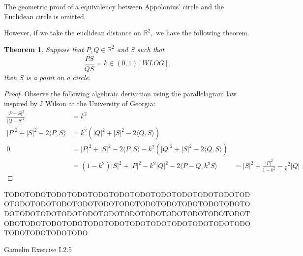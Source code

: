 \documentclass[letter]{article}
\newtheorem{theorem}{Theorem}
\newenvironment{menumerate}{%
  \edef\backupindent{\the\parindent}%
  \enumerate%
  \setlength{\parindent}{\backupindent}%
}{\endenumerate}
\begin{document}
\begin{menumerate}
        The geometric proof of a equivalency between Appolonius' circle and the
        Euclidean circle is omitted.

        However, if we take the euclidean distance on $\mathbb{R}^2,$ we have the following theorem.
        \begin{theorem}
            Suppose that $P,Q \in \mathbb{R}^2$ and $S$ such that 
            $$\frac{\overline{PS}}{\overline{QS}} = k \in (0,1)[WLOG],$$
            then $S$ is a point on a circle.
        \end{theorem}
        \begin{proof}
            Observe the following algebraic derivation using the parallelagram law inspired by J Wilson at the University of Georgia:
            \begin{equation*}
                \begin{aligned}
                    \frac{|P-S|^2}{|Q-S|^2} &= k^2 \\
                     |P|^2 + |S|^2 -2\langle P, S \rangle &= k^2(|Q|^2 + |S|^2 - 2\langle Q,S\rangle ) \\
                     0&= |P|^2 + |S|^2 -2\langle P, S \rangle - k^2(|Q|^2 + |S|^2 - 2\langle Q,S\rangle ) \\
                     &= (1-k^2)|S|^2 + |P|^2 -k^2|Q|^2 -2\langle P - Q, k^2S \rangle
                     &= |S|^2 + \frac{|P|^2}{1-k^2} - \frac{}k^2|Q|
                \end{aligned}
            \end{equation*}
        \end{proof}
        TODOTODOTODOTODOTODOTODOTODOTODOTODOTODOTODOTODOTODOTODOTODOTODOTODOTODOTODOTODOTODOTODOTODOTODOTODOTODOTODOTODOTODOTODOTODOTODOTODOTODOTODOTODOTODOTODOTODOTODOTODOTODOTODOTODOTODOTODOTODOTODOTODOTODOTODO

        \item Gamelin Exercise I.2.5


\end{menumerate}
\end{document}
